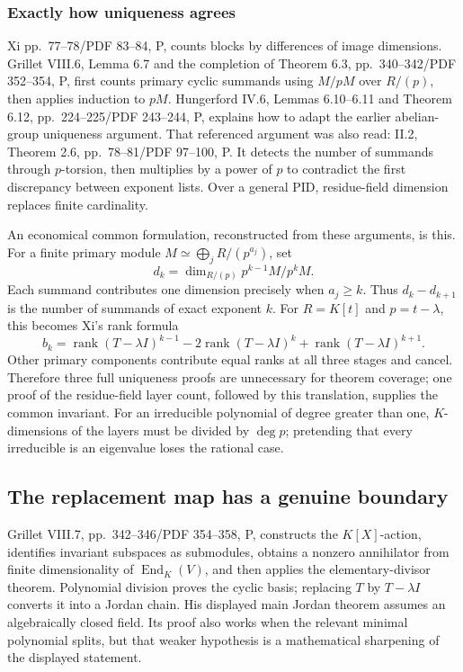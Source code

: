 \documentclass[
  11pt,
]{article}
\begin{document}
\subsubsection{Exactly how uniqueness
agrees}\label{exactly-how-uniqueness-agrees}

Xi pp.~77--78/PDF 83--84, P, counts blocks by differences of image
dimensions. Grillet VIII.6, Lemma 6.7 and the completion of Theorem 6.3,
pp.~340--342/PDF 352--354, P, first counts primary cyclic summands using
\(M/pM\) over \(R/(p)\), then applies induction to \(pM\). Hungerford
IV.6, Lemmas 6.10--6.11 and Theorem 6.12, pp.~224--225/PDF 243--244, P,
explains how to adapt the earlier abelian-group uniqueness argument.
That referenced argument was also read: II.2, Theorem 2.6,
pp.~78--81/PDF 97--100, P. It detects the number of summands through
\(p\)-torsion, then multiplies by a power of \(p\) to contradict the
first discrepancy between exponent lists. Over a general PID,
residue-field dimension replaces finite cardinality.

An economical common formulation, reconstructed from these arguments, is
this. For a finite primary module \(M\simeq\bigoplus_jR/(p^{a_j})\), set
\[
d_k=\dim_{R/(p)}p^{k-1}M/p^kM.
\] Each summand contributes one dimension precisely when \(a_j\ge k\).
Thus \(d_k-d_{k+1}\) is the number of summands of exact exponent \(k\).
For \(R=K[t]\) and \(p=t-\lambda\), this becomes Xi's rank formula \[
b_k=\operatorname{rank}(T-\lambda I)^{k-1}
-2\operatorname{rank}(T-\lambda I)^k
+\operatorname{rank}(T-\lambda I)^{k+1}.
\] Other primary components contribute equal ranks at all three stages
and cancel. Therefore three full uniqueness proofs are unnecessary for
theorem coverage; one proof of the residue-field layer count, followed
by this translation, supplies the common invariant. For an irreducible
polynomial of degree greater than one, \(K\)-dimensions of the layers
must be divided by \(\deg p\); pretending that every irreducible is an
eigenvalue loses the rational case.

\subsection{The replacement map has a genuine
boundary}\label{the-replacement-map-has-a-genuine-boundary}

Grillet VIII.7, pp.~342--346/PDF 354--358, P, constructs the
\(K[X]\)-action, identifies invariant subspaces as submodules, obtains a
nonzero annihilator from finite dimensionality of
\(\operatorname{End}_K(V)\), and then applies the elementary-divisor
theorem. Polynomial division proves the cyclic basis; replacing \(T\) by
\(T-\lambda I\) converts it into a Jordan chain. His displayed main
Jordan theorem assumes an algebraically closed field. Its proof also
works when the relevant minimal polynomial splits, but that weaker
hypothesis is a mathematical sharpening of the displayed statement.
\end{document}

